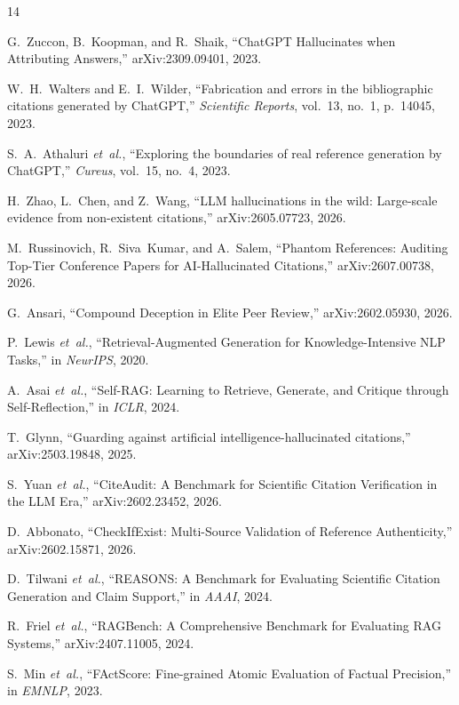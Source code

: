 \documentclass[11pt,a4paper]{article}
\begin{document}
\begin{thebibliography}{14}

G.~Zuccon, B.~Koopman, and R.~Shaik, ``ChatGPT Hallucinates when Attributing Answers,'' arXiv:2309.09401, 2023.

W.~H.~Walters and E.~I.~Wilder, ``Fabrication and errors in the bibliographic citations generated by ChatGPT,'' \emph{Scientific Reports}, vol.~13, no.~1, p.~14045, 2023.

S.~A.~Athaluri \emph{et~al.}, ``Exploring the boundaries of real reference generation by ChatGPT,'' \emph{Cureus}, vol.~15, no.~4, 2023.

H.~Zhao, L.~Chen, and Z.~Wang, ``LLM hallucinations in the wild: Large-scale evidence from non-existent citations,'' arXiv:2605.07723, 2026.

M.~Russinovich, R.~Siva~Kumar, and A.~Salem, ``Phantom References: Auditing Top-Tier Conference Papers for AI-Hallucinated Citations,'' arXiv:2607.00738, 2026.

G.~Ansari, ``Compound Deception in Elite Peer Review,'' arXiv:2602.05930, 2026.

P.~Lewis \emph{et~al.}, ``Retrieval-Augmented Generation for Knowledge-Intensive NLP Tasks,'' in \emph{NeurIPS}, 2020.

A.~Asai \emph{et~al.}, ``Self-RAG: Learning to Retrieve, Generate, and Critique through Self-Reflection,'' in \emph{ICLR}, 2024.

T.~Glynn, ``Guarding against artificial intelligence-hallucinated citations,'' arXiv:2503.19848, 2025.

S.~Yuan \emph{et~al.}, ``CiteAudit: A Benchmark for Scientific Citation Verification in the LLM Era,'' arXiv:2602.23452, 2026.

D.~Abbonato, ``CheckIfExist: Multi-Source Validation of Reference Authenticity,'' arXiv:2602.15871, 2026.

D.~Tilwani \emph{et~al.}, ``REASONS: A Benchmark for Evaluating Scientific Citation Generation and Claim Support,'' in \emph{AAAI}, 2024.

R.~Friel \emph{et~al.}, ``RAGBench: A Comprehensive Benchmark for Evaluating RAG Systems,'' arXiv:2407.11005, 2024.

S.~Min \emph{et~al.}, ``FActScore: Fine-grained Atomic Evaluation of Factual Precision,'' in \emph{EMNLP}, 2023.

\end{thebibliography}
\end{document}
